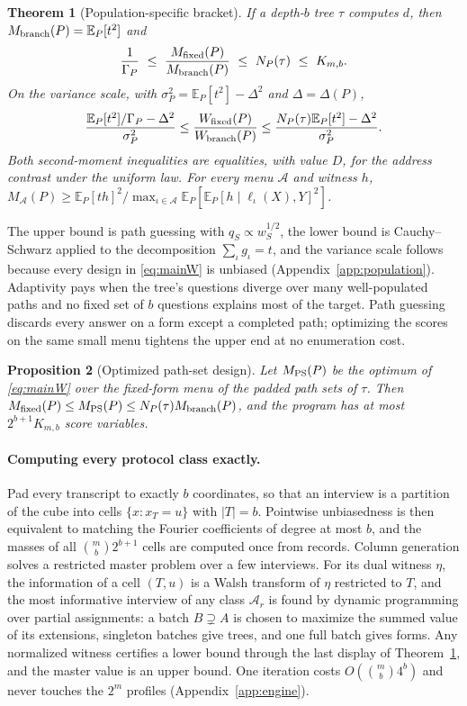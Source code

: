 \documentclass{article}
\newtheorem{theorem}{Theorem}
\newtheorem{proposition}[theorem]{Proposition}
\newcommand{\E}{\mathbb{E}}
\newcommand{\A}{\mathcal A}
\begin{document}
\begin{theorem}[Population-specific bracket]\label{thm:bracket}
If a depth-$b$ tree $\tau$ computes $d$, then $M_{\rm branch}(P)=\E_P[t^2]$ and
\[
 \frac1{\Gamma_P}\ \le\ \frac{M_{\rm fixed}(P)}{M_{\rm branch}(P)}\ \le\ N_P(\tau)\ \le\ K_{m,b}.
\]
On the variance scale, with $\sigma_P^2=\E_P[t^2]-\Delta^2$ and $\Delta=\Delta(P)$,
\[
 \frac{\E_P[t^2]/\Gamma_P-\Delta^2}{\sigma_P^2}\le\frac{W_{\rm fixed}(P)}{W_{\rm branch}(P)}\le\frac{N_P(\tau)\E_P[t^2]-\Delta^2}{\sigma_P^2}.
\]
Both second-moment inequalities are equalities, with value $D$, for the address contrast under the uniform law. For every menu $\A$ and witness $h$, $M_\A(P)\ge\E_P[th]^2/\max_{\iota\in\A}\E_P[\E_P[h\mid\ell_\iota(X),Y]^2]$.
\end{theorem}
The upper bound is path guessing with $q_S\propto w_S^{1/2}$, the lower bound is Cauchy--Schwarz applied to the decomposition $\sum_\iota g_\iota=t$, and the variance scale follows because every design in \eqref{eq:mainW} is unbiased (Appendix~\ref{app:population}). Adaptivity pays when the tree's questions diverge over many well-populated paths and no fixed set of $b$ questions explains most of the target. Path guessing discards every answer on a form except a completed path; optimizing the scores on the same small menu tightens the upper end at no enumeration cost.

\begin{proposition}[Optimized path-set design]\label{prop:uppermain}
Let $M_{\rm PS}(P)$ be the optimum of \eqref{eq:mainW} over the fixed-form menu of the padded path sets of $\tau$. Then $M_{\rm fixed}(P)\le M_{\rm PS}(P)\le N_P(\tau)M_{\rm branch}(P)$, and the program has at most $2^{b+1}K_{m,b}$ score variables.
\end{proposition}

\paragraph{Computing every protocol class exactly.}
Pad every transcript to exactly $b$ coordinates, so that an interview is a partition of the cube into cells $\{x:x_T=u\}$ with $|T|=b$. Pointwise unbiasedness is then equivalent to matching the Fourier coefficients of degree at most $b$, and the masses of all $\binom mb2^{b+1}$ cells are computed once from records. Column generation solves a restricted master problem over a few interviews. For its dual witness $\eta$, the information of a cell $(T,u)$ is a Walsh transform of $\eta$ restricted to $T$, and the most informative interview of any class $\A_r$ is found by dynamic programming over partial assignments: a batch $B\supsetneq A$ is chosen to maximize the summed value of its extensions, singleton batches give trees, and one full batch gives forms. Any normalized witness certifies a lower bound through the last display of Theorem~\ref{thm:bracket}, and the master value is an upper bound. One iteration costs $O(\binom mb4^b)$ and never touches the $2^m$ profiles (Appendix~\ref{app:engine}).
\end{document}
